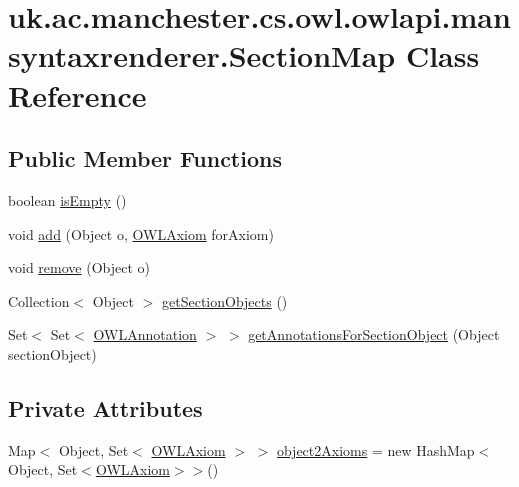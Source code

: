 \hypertarget{classuk_1_1ac_1_1manchester_1_1cs_1_1owl_1_1owlapi_1_1mansyntaxrenderer_1_1_section_map}{\section{uk.\-ac.\-manchester.\-cs.\-owl.\-owlapi.\-mansyntaxrenderer.\-Section\-Map Class Reference}
\label{classuk_1_1ac_1_1manchester_1_1cs_1_1owl_1_1owlapi_1_1mansyntaxrenderer_1_1_section_map}
}
\subsection*{Public Member Functions}
\begin{DoxyCompactItemize}
\item 
boolean \hyperlink{classuk_1_1ac_1_1manchester_1_1cs_1_1owl_1_1owlapi_1_1mansyntaxrenderer_1_1_section_map_a6b2e8717b6e7b744865e9b1bfd425f07}{is\-Empty} ()
\item 
void \hyperlink{classuk_1_1ac_1_1manchester_1_1cs_1_1owl_1_1owlapi_1_1mansyntaxrenderer_1_1_section_map_a81d5568033b99215bfe48ebc436303f9}{add} (Object o, \hyperlink{interfaceorg_1_1semanticweb_1_1owlapi_1_1model_1_1_o_w_l_axiom}{O\-W\-L\-Axiom} for\-Axiom)
\item 
void \hyperlink{classuk_1_1ac_1_1manchester_1_1cs_1_1owl_1_1owlapi_1_1mansyntaxrenderer_1_1_section_map_abdb004dec62b6c1aaca16c6597e48641}{remove} (Object o)
\item 
Collection$<$ Object $>$ \hyperlink{classuk_1_1ac_1_1manchester_1_1cs_1_1owl_1_1owlapi_1_1mansyntaxrenderer_1_1_section_map_abc90788c66e718910d62edc7bacdbe53}{get\-Section\-Objects} ()
\item 
Set$<$ Set$<$ \hyperlink{interfaceorg_1_1semanticweb_1_1owlapi_1_1model_1_1_o_w_l_annotation}{O\-W\-L\-Annotation} $>$ $>$ \hyperlink{classuk_1_1ac_1_1manchester_1_1cs_1_1owl_1_1owlapi_1_1mansyntaxrenderer_1_1_section_map_afabbacec9c04e4f2f1a4d16fd78da84c}{get\-Annotations\-For\-Section\-Object} (Object section\-Object)
\end{DoxyCompactItemize}
\subsection*{Private Attributes}
\begin{DoxyCompactItemize}
\item 
Map$<$ Object, Set$<$ \hyperlink{interfaceorg_1_1semanticweb_1_1owlapi_1_1model_1_1_o_w_l_axiom}{O\-W\-L\-Axiom} $>$ $>$ \hyperlink{classuk_1_1ac_1_1manchester_1_1cs_1_1owl_1_1owlapi_1_1mansyntaxrenderer_1_1_section_map_a3bf27177024954548a0bfee22c05abd6}{object2\-Axioms} = new Hash\-Map$<$Object, Set$<$\hyperlink{interfaceorg_1_1semanticweb_1_1owlapi_1_1model_1_1_o_w_l_axiom}{O\-W\-L\-Axiom}$>$$>$()
\end{DoxyCompactItemize}


